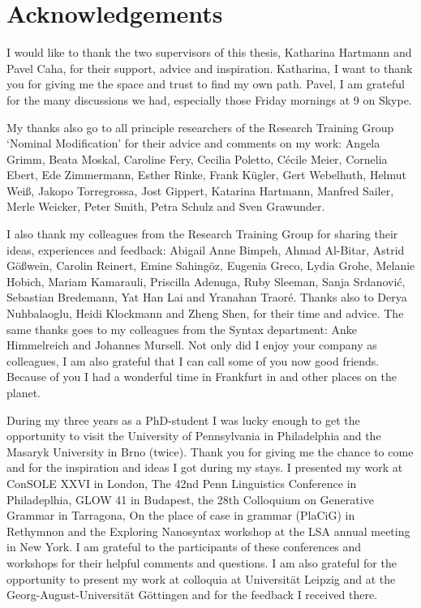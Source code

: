 
\chapter*[Acknowledgements]{Acknowledgements}

I would like to thank the two supervisors of this thesis, Katharina Hartmann and Pavel Caha, for their support, advice and inspiration.
Katharina, I want to thank you for giving me the space and trust to find my own path.
Pavel, I am grateful for the many discussions we had, especially those Friday mornings at 9 on Skype.

My thanks also go to all principle researchers of the Research Training Group `Nominal Modification' for their advice and comments on my work:
Angela Grimm,
Beata Moskal,
Caroline Fery,
Cecilia Poletto,
Cécile Meier,
Cornelia Ebert,
Ede Zimmermann,
Esther Rinke,
Frank Kügler,
Gert Webelhuth,
Helmut Weiß,
Jakopo Torregrossa,
Jost Gippert,
Katarina Hartmann,
Manfred Sailer,
Merle Weicker,
Peter Smith,
Petra Schulz and
Sven Grawunder.

I also thank my colleagues from the Research Training Group for sharing their ideas, experiences and feedback:
Abigail Anne Bimpeh,
Ahmad Al-Bitar,
Astrid Gößwein,
Carolin Reinert,
Emine Sahingöz,
Eugenia Greco,
Lydia Grohe,
Melanie Hobich,
Mariam Kamarauli,
Priscilla Adenuga,
Ruby Sleeman,
Sanja Srdanović,
Sebastian Bredemann,
Yat Han Lai and
Yranahan Traoré.
Thanks also to
Derya Nuhbalaoglu,
Heidi Klockmann and
Zheng Shen,
for their time and advice.
The same thanks goes to my colleagues from the Syntax department:
Anke Himmelreich and Johannes Mursell.
Not only did I enjoy your company as colleagues, I am also grateful that I can call some of you now good friends.
Because of you I had a wonderful time in Frankfurt in and other places on the planet.

During my three years as a PhD-student I was lucky enough to get the opportunity to visit the University of Pennsylvania in Philadelphia and the Masaryk University in Brno (twice). Thank you for giving me the chance to come and for the inspiration and ideas I got during my stays.
I presented my work at
ConSOLE XXVI in London,
The 42nd Penn Linguistics Conference in Philadeplhia,
GLOW 41 in Budapest,
the 28th Colloquium on Generative Grammar in Tarragona,
On the place of case in grammar (PlaCiG) in Rethymnon and
the Exploring Nanosyntax workshop at the LSA annual meeting in New York.
I am grateful to the participants of these conferences and workshops for their helpful comments and questions.
I am also grateful for the opportunity to present my work at colloquia at Universität Leipzig and at the Georg-August-Universität Göttingen and for the feedback I received there.

